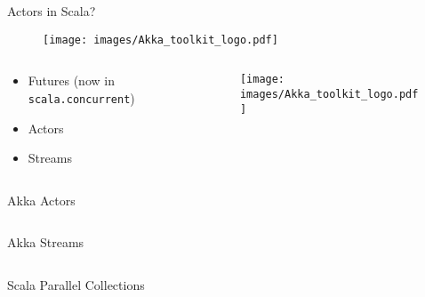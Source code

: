 \documentclass[aspectratio=169]{beamer}
\newcommand{\megatext}[1]{
  \begin{center}
    \Huge
    #1
  \end{center}
}
\begin{document}
\begin{frame}
  \megatext{Actors in Scala?}
\end{frame}


\begin{frame}
  \begin{figure}
    \texttt{[image: images/Akka\_toolkit\_logo.pdf]}
  \end{figure}
\end{frame}


\begin{frame}
  \begin{columns}[c]
    \begin{column}{0.5\textwidth}
      \begin{itemize}
      \item Futures (now in \texttt{scala.concurrent})
      \item Actors
      \item Streams
      \end{itemize}
    \end{column}

    \begin{column}{0.5\textwidth}
      \begin{figure}
        \texttt{[image: images/Akka\_toolkit\_logo.pdf]}
      \end{figure}
    \end{column}
  \end{columns}
\end{frame}


\begin{frame}[fragile]{Akka Actors}
  \inputminted{scala}{snippets/actor.scala}
\end{frame}


\begin{frame}[fragile]{Akka Streams}
  \inputminted{scala}{snippets/streams.scala}
\end{frame}

\begin{frame}[fragile]{Scala Parallel Collections}
  \inputminted{scala}{snippets/pcoll.scala}
\end{frame}
\end{document}
